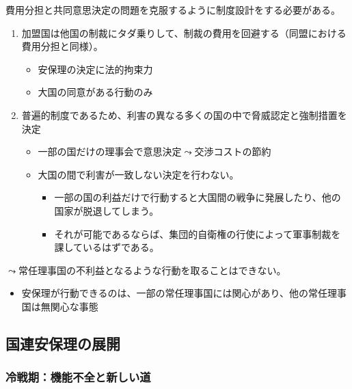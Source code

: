 \documentclass[
  xelatex,
  ja=standard]{bxjsarticle}
\providecommand{\tightlist}{%
  \setlength{\itemsep}{0pt}\setlength{\parskip}{0pt}}\usepackage{longtable,booktabs,array}
\begin{document}
費用分担と共同意思決定の問題を克服するように制度設計をする必要がある。

\begin{enumerate}
\def\labelenumi{\arabic{enumi}.}
\tightlist
\item
  加盟国は他国の制裁にタダ乗りして、制裁の費用を回避する（同盟における費用分担と同様）。

  \begin{itemize}
  \tightlist
  \item
    安保理の決定に法的拘束力
  \item
    大国の同意がある行動のみ
  \end{itemize}
\item
  普遍的制度であるため、利害の異なる多くの国の中で脅威認定と強制措置を決定

  \begin{itemize}
  \tightlist
  \item
    一部の国だけの理事会で意思決定\(\leadsto\)交渉コストの節約
  \item
    大国の間で利害が一致しない決定を行わない。

    \begin{itemize}
    \tightlist
    \item
      一部の国の利益だけで行動すると大国間の戦争に発展したり、他の国家が脱退してしまう。
    \item
      それが可能であるならば、集団的自衛権の行使によって軍事制裁を課しているはずである。
    \end{itemize}
  \end{itemize}
\end{enumerate}

\(\leadsto\)常任理事国の不利益となるような行動を取ることはできない。

\begin{itemize}
\tightlist
\item
  安保理が行動できるのは、一部の常任理事国には関心があり、他の常任理事国は無関心な事態
\end{itemize}

\hypertarget{ux56fdux9023ux5b89ux4fddux7406ux306eux5c55ux958b}{%
\subsection{国連安保理の展開}\label{ux56fdux9023ux5b89ux4fddux7406ux306eux5c55ux958b}}

\hypertarget{ux51b7ux6226ux671fux6a5fux80fdux4e0dux5168ux3068ux65b0ux3057ux3044ux9053}{%
\subsubsection{冷戦期：機能不全と新しい道}\label{ux51b7ux6226ux671fux6a5fux80fdux4e0dux5168ux3068ux65b0ux3057ux3044ux9053}}
\end{document}
